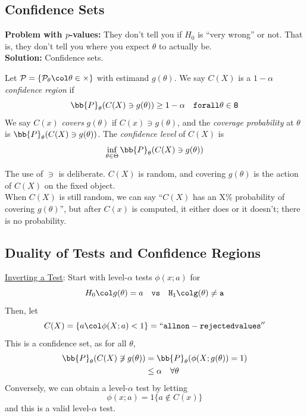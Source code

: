 \subsection*{Confidence Sets}
\sectionspace

\textbf{Problem with $p$-values:} They don't tell you if $H_0$ is ``very wrong'' or not. That is, they don't tell you where you expect $\theta$ to actually be.\\

\textbf{Solution:} Confidence sets.

\begin{definition}
    Let $\cal{P} = \{P_{\theta} \col \theta \in \Theta\}$ with estimand $g(\theta)$. We say $C(X)$ is a \emph{$1 - \alpha$ confidence region} if
    \[ \bb{P}_{\theta}(C(X) \ni g(\theta)) \geq 1 - \alpha \quad \tt{for all } \theta \in \Theta \]
    We say $C(x)$ \emph{covers} $g(\theta)$ if $C(x) \ni g(\theta)$, and the \emph{coverage probability} at $\theta$ is $\bb{P}_{\theta}(C(X) \ni g(\theta))$. The \emph{confidence level} of $C(X)$ is
    \[ \inf_{\theta \in \Theta} \bb{P}_{\theta}(C(X) \ni g(\theta)) \]
\end{definition}

The use of $\ni$ is deliberate. $C(X)$ is random, and covering $g(\theta)$ is the action of $C(X)$ on the fixed object.\\

When $C(X)$ is still random, we can say ``$C(X)$ has an X\% probability of covering $g(\theta)$'', but after $C(x)$ is computed, it either does or it doesn't; there is no probability.

\subsection*{Duality of Tests and Confidence Regions}
\sectionspace

\underline{Inverting a Test}: Start with level-$\alpha$ tests $\phi(x; a)$ for
\[ H_0 \col g(\theta) = a \quad \tt{vs} \quad H_1 \col g(\theta) \neq a \]
Then, let
\[ C(X) = \{a \col \phi(X; a) < 1\} = \tt{``all non-rejected values''} \]
This is a confidence set, as for all $\theta$,
\begin{align*}
    \bb{P}_{\theta}(C(X) \not\ni g(\theta)) &= \bb{P}_{\theta}(\phi(X; g(\theta)) = 1)\\
    &\leq \alpha \quad \forall \theta
\end{align*}
Conversely, we can obtain a level-$\alpha$ test by letting
\[ \phi(x; a) = 1\{a \notin C(x)\} \]
and this is a valid level-$\alpha$ test.


